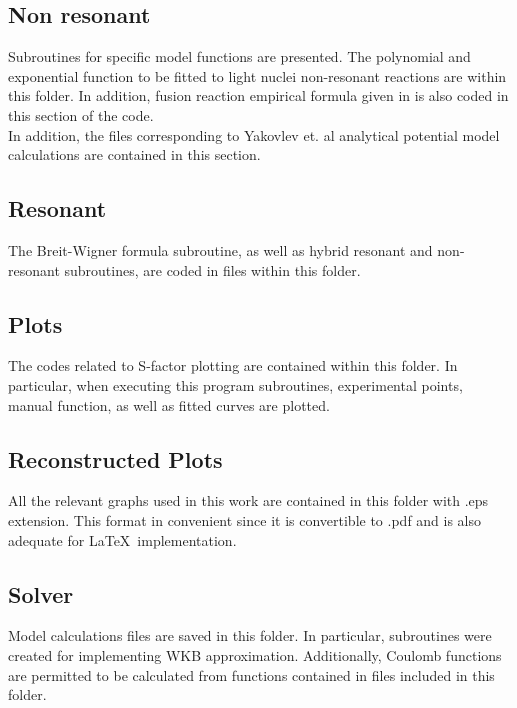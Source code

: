 \documentclass[openany]{book}
\begin{document}
\subsection{Non resonant} \label{sub:codesNonResonant}

Subroutines for specific model functions are presented. The polynomial and exponential function to be fitted to light nuclei non-resonant reactions are within this folder. In addition, fusion reaction empirical formula given in \cite{beard_afanasjev_chamon_gasques_wiescher_yakovlev_2010} is also coded in this section of the code.  \\

In addition, the files corresponding to Yakovlev et. al analytical potential model \cite{yakovlev_beard_gasques_wiescher_2010} calculations are contained in this section. 

\subsection{Resonant} \label{sub:codesResonant}

The Breit-Wigner formula subroutine, as well as hybrid resonant and non-resonant subroutines, are coded in files within this folder.

\subsection{Plots} \label{sub:codesPlots}

The codes related to S-factor plotting are contained within this folder. In particular, when executing this program subroutines, experimental points, manual function, as well as fitted curves are plotted.

\subsection{Reconstructed Plots} \label{sub:codesReconstructedPlots}

All the relevant graphs used in this work are contained in this folder with .eps extension. This format in convenient since it is convertible to .pdf and is also adequate for \LaTeX  \ implementation.


\subsection{Solver} \label{sub:codesSolver}

Model calculations files are saved in this folder. In particular, subroutines were created for implementing WKB approximation. Additionally, Coulomb functions are permitted to be calculated from functions contained in files included in this folder.
\end{document}
